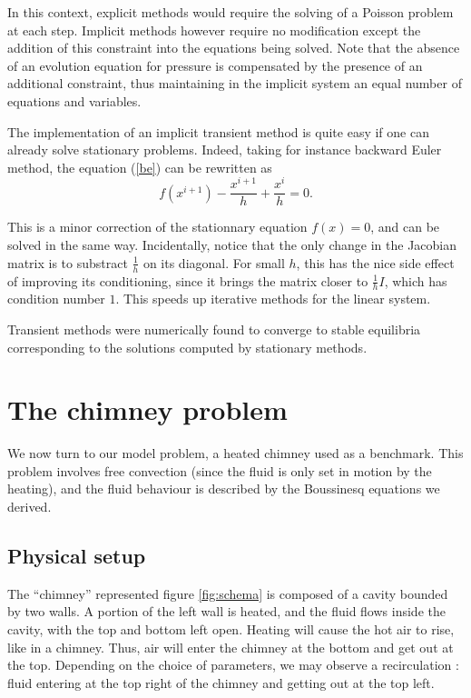 \documentclass[12pt]{article}
\begin{document}
In this context, explicit methods would require the solving of a
Poisson problem at each step. Implicit methods however require no
modification except the addition of this constraint into the equations
being solved. Note that the absence of an evolution equation for
pressure is compensated by the presence of an additional constraint,
thus maintaining in the implicit system an equal number of equations
and variables.

The implementation of an implicit transient method is quite easy if
one can already solve stationary problems. Indeed, taking for instance
backward Euler method, the equation (\ref{be}) can be rewritten
as
$$f(x^{i+1}) - \frac{x^{i+1}}{h} + \frac{x^i}{h} = 0.$$

This is a minor correction of the stationnary equation $f(x) = 0$, and
can be solved in the same way. Incidentally, notice that the only
change in the Jacobian matrix is to substract $\frac{1}{h}$ on its
diagonal. For small $h$, this has the nice side effect of improving
its conditioning, since it brings the matrix closer to $\frac{1}{h}
I$, which has condition number $1$. This speeds up iterative methods
for the linear system.

Transient methods were numerically found to converge to stable
equilibria corresponding to the solutions computed by stationary
methods.
\section{The chimney problem}
We now turn to our model problem, a heated chimney used as a
benchmark. This problem involves free convection (since the fluid is
only set in motion by the heating), and the fluid behaviour is
described by the Boussinesq equations we derived.
\subsection{Physical setup}
The ``chimney'' represented figure \ref{fig:schema} is composed of a
cavity bounded by two walls. A portion of the left wall is heated, and
the fluid flows inside the cavity, with the top and bottom left
open. Heating will cause the hot air to rise, like in a chimney. Thus,
air will enter the chimney at the bottom and get out at the
top. Depending on the choice of parameters, we may observe a
recirculation : fluid entering at the top right of the chimney and
getting out at the top left.
\end{document}
